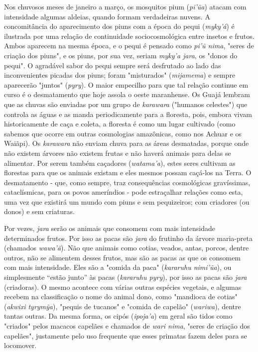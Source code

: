 Nos chuvosos meses de janeiro a março, os mosquitos pium (\emph{pi'ũa})
atacam com intensidade algumas aldeias, quando formam verdadeiras
nuvens. A concomitância do aparecimento dos piuns com a época do pequi
(\emph{myky'á}) é ilustrada por uma relação de continuidade
sociocosmológica entre insetos e frutos. Ambos aparecem na mesma época,
e o pequi é pensado como \emph{pi'ũ nima}, "seres de criação dos piuns",
e os piuns, por sua vez, seriam \emph{myky'a jara}, os "donos do pequi".
O agradável sabor do pequi sempre será desfrutado ao lado das
inconvenientes picadas dos piuns; foram "misturados" (\emph{mijamema}) e
sempre aparecerão "juntos" (\emph{pyry}). O maior empecilho para que tal
relação continue em curso é o desmatamento que hoje assola o oeste
maranhense. Os Guajá lembram que as chuvas são enviadas por um grupo de
\emph{karawara} ("humanos celestes") que controla as águas e as manda
periodicamente para a floresta, pois, embora vivam historicamente de
caça e coleta, a floresta é como um lugar cultivado (como sabemos que
ocorre em outras cosmologias amazônicas, como nos Achuar e os Waiãpi).
Os \emph{karawara} não enviam chuva para as áreas desmatadas, porque
onde não existem árvores não existem frutas e não haverá animais para
delas se alimentar. Por serem também caçadores (\emph{watama'a}), estes
seres cultivam as florestas para que os animais existam e eles mesmos
possam caçá-los na Terra. O desmatamento - que, como sempre, traz
consequências cosmológicas gravíssimas, cataclísmicas, para os povos
ameríndios - pode estraçalhar relações como esta, uma vez que existirá
um mundo com piuns e sem pequizeiros; com criadores (ou donos) e sem
criaturas.

Por vezes, \emph{jara} serão os animais que consomem com mais
intensidade determinados frutos. Por isso as pacas são \emph{jara} do
frutinho da árvore maria-preta (chamados \emph{wawa'ã}). Não que animais
como cotias, veados, antas, porcos, dentre outros, não se alimentem
desses frutos, mas são as pacas as que os consomem com mais intensidade.
Eles são a "comida da paca" (\emph{kararuhu nimi'ũa}), ou simplesmente
``estão junto'' às pacas (\emph{kararuhu pyry}), por isso as pacas são
\emph{jara} (criadoras). O mesmo acontece com várias outras espécies
vegetais, e algumas recebem na classificação o nome do animal dono, como
"mandioca de cotias" (\emph{akwixi tyrymỹa}), "pequis de tucanos" e
"comida de capelão" (\emph{wariwa}), dentre tantas outras. Da mesma
forma, os cipós (\emph{ipoja'a}) em geral são tidos como "criados" pelos
macacos capelães e chamados de \emph{wari nima}, "seres de criação dos
capelães", justamente pelo uso frequente que esses primatas fazem deles
para se locomover.

